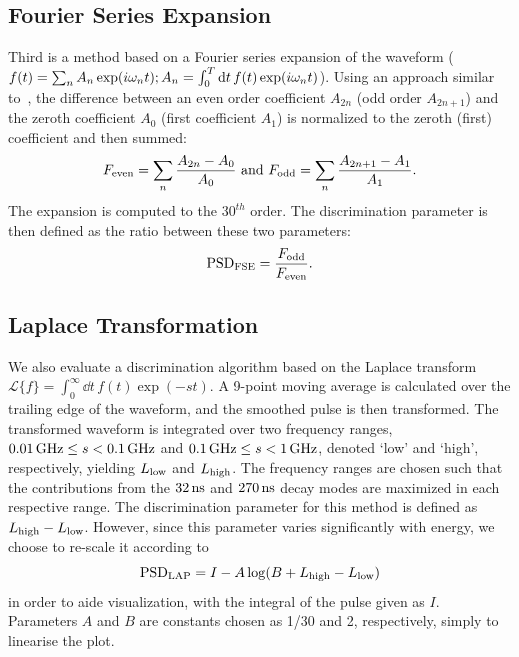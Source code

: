 \subsection{Fourier Series Expansion}

Third is a method based on a Fourier series expansion of the waveform ($f(t) = \sum_n A_n \exp (i\omega_n t); A_n = \int_0^T \mathrm{d}t\,f(t) \exp (i\omega_n t)$). Using an approach similar to~\cite{Liu:2010}, the difference between an even order coefficient $A_{2n}$ (odd order $A_{2n+1}$) and the zeroth coefficient $A_0$ (first coefficient $A_1$) is normalized to the zeroth (first) coefficient and then summed:
\begin{equation}
\displaystyle
F_{\mathrm{even}} = \sum_{n} \frac{A_{2n}-A_0}{A_0} \mathrm{~and~} F_{\mathrm{odd}} = \sum_{n} \frac{A_{2n+1}-A_1}{A_1}.
\end{equation}
The expansion is computed to the $30^{th}$ order. The discrimination parameter is then defined as the ratio between these two parameters:
\begin{equation}
\mathrm{PSD}_{\mathrm{FSE}} = \frac{F_{\mathrm{odd}}}{F_{\mathrm{even}}}.
\end{equation}


\subsection{Laplace Transformation}

We also evaluate a discrimination algorithm based on the Laplace transform $\mathcal{L}\{f\} = \int_0^{\infty} \dd t\,f(t)\exp(-st)$. A 9-point moving average is calculated over the trailing edge of the waveform, and the smoothed pulse is then transformed. The transformed waveform is integrated over two frequency ranges, $0.01\,\mathrm{GHz}\leq s<0.1\,\mathrm{GHz}$ and $0.1\,\mathrm{GHz}\leq s<1\,\mathrm{GHz}$, denoted `low' and `high', respectively, yielding $L_{\mathrm{low}}$ and $L_{\mathrm{high}}$. The frequency ranges are chosen such that the contributions from the $32\,\mathrm{ns}$ and $270\,\mathrm{ns}$ decay modes are maximized in each respective range. The discrimination parameter for this method is defined as $L_{\mathrm{high}}-L_{\mathrm{low}}$. However, since this parameter varies significantly with energy, we choose to re-scale it according to
\begin{equation}
\mathrm{PSD}_{\mathrm{LAP}} = I- A \log(B + L_{\mathrm{high}} - L_{\mathrm{low}})
\end{equation}
in order to aide visualization, with the integral of the pulse given as $I$. Parameters $A$ and $B$ are constants chosen as 1/30 and 2, respectively, simply to linearise the plot.

